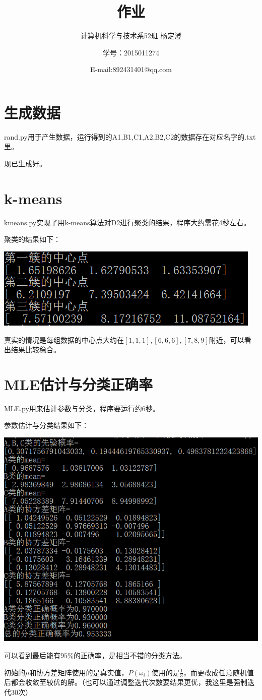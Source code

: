 \documentclass{ctexart}
\begin{document}
\title{作业}
\author{计算机科学与技术系52班 杨定澄 \and 学号：2015011274 \and E-mail:892431401@qq.com}
\date{}
\maketitle
\section{生成数据}
rand.py用于产生数据，运行得到的A1,B1,C1,A2,B2,C2的数据存在对应名字的.txt里。

现已生成好。
\section{k-means}
kmeans.py实现了用k-means算法对D2进行聚类的结果，程序大约需花4秒左右。

聚类的结果如下：

\includegraphics{1.png}

真实的情况是每组数据的中心点大约在$[1,1,1],[6,6,6],[7,8,9]$附近，可以看出结果比较稳合。
\section{MLE估计与分类正确率}
MLE.py用来估计参数与分类，程序要运行约6秒。

参数估计与分类结果如下：

\includegraphics{2.png}

可以看到最后能有$95\%$的正确率，是相当不错的分类方法。

初始的$\mu$和协方差矩阵使用的是真实值，$P(\omega_i)$使用的是$\frac{1}{3}$，而更改成任意随机值后都会收敛至较优的解。（也可以通过调整迭代次数要结果更优，我这里是强制迭代30次）
\end{document}
